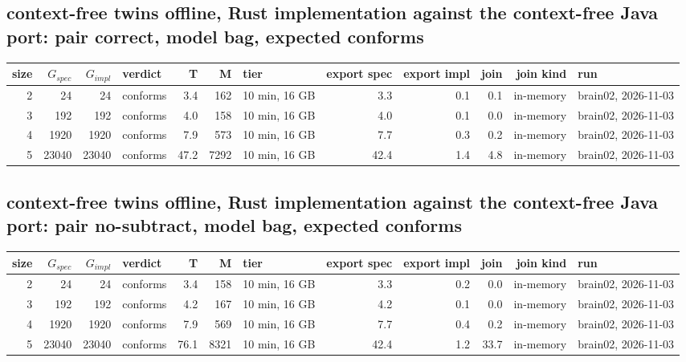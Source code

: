 \documentclass[10pt]{article}
\begin{document}
\subsection*{context-free twins offline, Rust implementation against the context-free Java port: pair \textsf{correct}, model bag, expected conforms}
\begin{longtable}{@{}rrrlrrlrrrrl@{}}
\toprule
size & $G_{\mathit{spec}}$ & $G_{\mathit{impl}}$ & verdict & T & M & tier & export spec & export impl & join & join kind & run \\
\midrule
\endhead
\color{red} 2 & 24 & 24 & conforms & 3.4 & 162 & 10 min, 16 GB & 3.3 & 0.1 & 0.1 & in-memory & brain02, 2026-11-03 \\
\color{red} 3 & 192 & 192 & conforms & 4.0 & 158 & 10 min, 16 GB & 4.0 & 0.1 & 0.0 & in-memory & brain02, 2026-11-03 \\
\color{red} 4 & 1920 & 1920 & conforms & 7.9 & 573 & 10 min, 16 GB & 7.7 & 0.3 & 0.2 & in-memory & brain02, 2026-11-03 \\
\color{red} 5 & 23040 & 23040 & conforms & 47.2 & 7292 & 10 min, 16 GB & 42.4 & 1.4 & 4.8 & in-memory & brain02, 2026-11-03 \\
\bottomrule
\end{longtable}
\subsection*{context-free twins offline, Rust implementation against the context-free Java port: pair \textsf{no-subtract}, model bag, expected conforms}
\begin{longtable}{@{}rrrlrrlrrrrl@{}}
\toprule
size & $G_{\mathit{spec}}$ & $G_{\mathit{impl}}$ & verdict & T & M & tier & export spec & export impl & join & join kind & run \\
\midrule
\endhead
\color{red} 2 & 24 & 24 & conforms & 3.4 & 158 & 10 min, 16 GB & 3.3 & 0.2 & 0.0 & in-memory & brain02, 2026-11-03 \\
\color{red} 3 & 192 & 192 & conforms & 4.2 & 167 & 10 min, 16 GB & 4.2 & 0.1 & 0.0 & in-memory & brain02, 2026-11-03 \\
\color{red} 4 & 1920 & 1920 & conforms & 7.9 & 569 & 10 min, 16 GB & 7.7 & 0.4 & 0.2 & in-memory & brain02, 2026-11-03 \\
\color{red} 5 & 23040 & 23040 & conforms & 76.1 & 8321 & 10 min, 16 GB & 42.4 & 1.2 & 33.7 & in-memory & brain02, 2026-11-03 \\
\bottomrule
\end{longtable}
\end{document}
